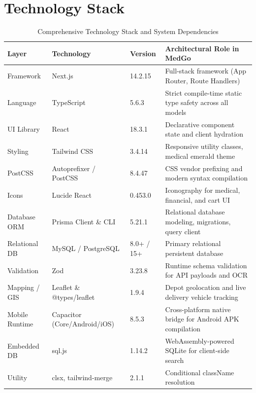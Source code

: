 \documentclass[10pt,a4paper]{article}
\begin{document}
\section{Technology Stack}
\begin{table}[h!]
\centering
\small
\begin{tabularx}{\textwidth}{p{2.8cm}p{3.8cm}p{2.0cm}X}
\toprule
\textbf{Layer} & \textbf{Technology} & \textbf{Version} & \textbf{Architectural Role in MedGo} \\
\midrule
Framework & Next.js & 14.2.15 & Full-stack framework (App Router, Route Handlers) \\
Language & TypeScript & 5.6.3 & Strict compile-time static type safety across all models \\
UI Library & React & 18.3.1 & Declarative component state and client hydration \\
Styling & Tailwind CSS & 3.4.14 & Responsive utility classes, medical emerald theme \\
PostCSS & Autoprefixer / PostCSS & 8.4.47 & CSS vendor prefixing and modern syntax compilation \\
Icons & Lucide React & 0.453.0 & Iconography for medical, financial, and cart UI \\
Database ORM & Prisma Client \& CLI & 5.21.1 & Relational database modeling, migrations, query client \\
Relational DB & MySQL / PostgreSQL & 8.0+ / 15+ & Primary relational persistent database \\
Validation & Zod & 3.23.8 & Runtime schema validation for API payloads and OCR \\
Mapping / GIS & Leaflet \& @types/leaflet & 1.9.4 & Depot geolocation and live delivery vehicle tracking \\
Mobile Runtime & Capacitor (Core/Android/iOS)& 8.5.3 & Cross-platform native bridge for Android APK compilation \\
Embedded DB & sql.js & 1.14.2 & WebAssembly-powered SQLite for client-side search \\
Utility & clsx, tailwind-merge & 2.1.1 & Conditional className resolution \\
\bottomrule
\end{tabularx}
\caption{Comprehensive Technology Stack and System Dependencies}
\end{table}

\end{document}
